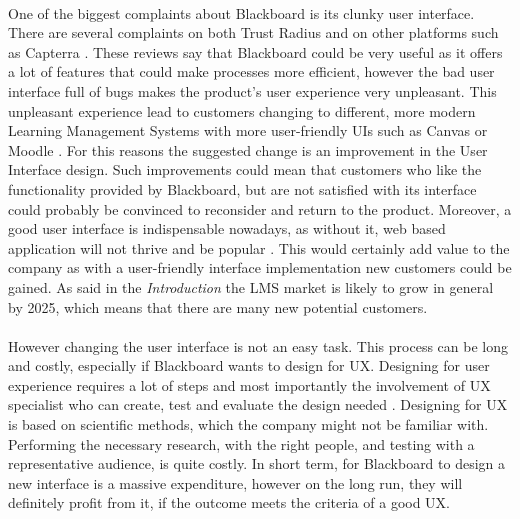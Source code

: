 \documentclass[]{article}
\begin{document}
\paragraph{}
One of the biggest complaints about Blackboard is its clunky user interface. There are several complaints on both Trust Radius \cite{BB-Reviews} and on other platforms such as Capterra \cite{Capterra-BB-Reviews}. These reviews say that Blackboard could be very useful as it offers a lot of features that could make processes more efficient, however the bad user interface full of bugs makes the product's user experience very unpleasant. This unpleasant experience lead to customers changing to different, more modern Learning Management Systems with more user-friendly UIs such as Canvas or Moodle \cite{BB-Alternatives}. For this reasons the suggested change is an improvement in the User Interface design. Such improvements could mean that customers who like the functionality provided by Blackboard, but are not satisfied with its interface could probably be convinced to reconsider and return to the product. Moreover, a good user interface is indispensable nowadays, as without it, web based application will not thrive and be popular \cite{UI-Advantages}. This would certainly add value to the company as with a user-friendly interface implementation new customers could be gained. As said in the \textit{Introduction} the LMS market is likely to grow in general by 2025, which means that there are many new potential customers. 

\paragraph{}
However changing the user interface is not an easy task. This process can be long and costly, especially if Blackboard wants to design for UX. Designing for user experience requires a lot of steps and most importantly the involvement of UX specialist who can create, test and evaluate the design needed \cite{UX-30000}. Designing for UX is based on scientific methods, which the company might not be familiar with. Performing the necessary research, with the right people, and testing with a representative audience, is quite costly. In short term, for Blackboard to design a new interface is a massive expenditure, however on the long run, they will definitely profit from it, if the outcome meets the criteria of a good UX. 
\end{document}
